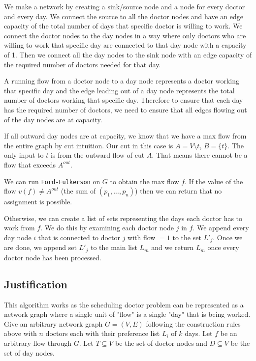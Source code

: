 \documentclass{article}
\begin{document}
We make a network by creating a sink/source node and a node for every doctor and every day. We connect the source to all the doctor nodes and have an edge capacity of the total number of days that specific doctor is willing to work.
We connect the doctor nodes to the day nodes in a way where only doctors who are willing to work that specific day are connected to that day node with a capacity of 1. 
Then we connect all the day nodes to the sink node with an edge capacity of the required number of doctors needed for that day.

A running flow from a doctor node to a day node represents a doctor working that specific day and the edge leading out of a day node represents the total number of doctors working that specific day.
Therefore to ensure that each day has the required number of doctors, we need to ensure that all edges flowing out of the day nodes are at capacity.

If all outward day nodes are at capacity, we know that we have a max flow from the entire graph by cut intuition. Our cut in this case is $A = V \setminus t $, $B = \{t\}$.
The only input to $t$ is from the outward flow of cut $A$. That means there cannot be a flow that exceeds $A^{out}$.

We can run \texttt{Ford-Fulkerson} on $G$ to obtain the max flow $f$. If the value of the flow $v(f) \neq A^{out}$ (the sum of $(p_1, ...,p_n)$) then we can return that no assignment is possible.

Otherwise, we can create a list of sets representing the days each doctor has to work from $f$.
We do this by examining each doctor node $j$ in $f$. We append every day node $i$ that is connected to doctor $j$ with flow $= 1$ to the set $L'_j$.
Once we are done, we append set $L'_j$ to the main list $L_m$ and we return $L_m$ once every doctor node has been processed.

\subsection{Justification}
This algorithm works as the scheduling doctor problem can be represented as a network graph where a single unit of "flow" is a single "day" that is being worked.
Give an arbitrary network graph $G = (V, E)$ following the construction rules above with $n$ doctors each with their preference list $L_i$ of $k$ days. 
Let $f$ be an arbitrary flow through $G$. 
Let $T \subseteq V$ be the set of doctor nodes and $D \subseteq V$ be the set of day nodes.
\end{document}
